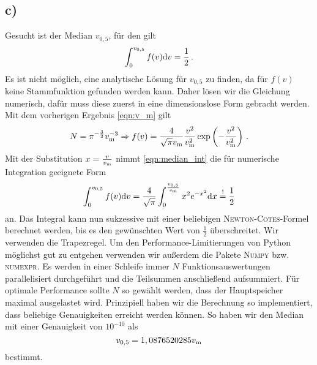 \documentclass[a4paper, 11pt]{article}
\begin{document}
\subsection*{c)}
Gesucht ist der Median $v_{0,5}$, für den gilt
\begin{equation}
    \int_{0}^{v_{0,5}} f(v) \textup{d}v = \frac{1}{2} \,.
    \label{eqn:median_int}
\end{equation}
Es ist nicht möglich, eine analytische Lösung für $v_{0,5}$ zu finden, da für $f(v)$ keine Stammfunktion gefunden werden kann. Daher lösen wir die Gleichung numerisch, dafür muss diese zuerst in eine dimensionslose Form gebracht werden. Mit dem vorherigen Ergebnis \eqref{eqn:v_m} gilt
\begin{equation}
    N = \pi^{-\frac{3}{2}}v_\textup{m}^{-3} \Rightarrow f(v) = \frac{4}{\sqrt{\pi}v_\textup{m}}\frac{v^2}{v_\textup{m}^2} \exp\left(-\frac{v^2}{v_\textup{m}^2}\right)\,.
\end{equation}
Mit der Substitution $x = \frac{v}{v_\textup{m}}$ nimmt \eqref{eqn:median_int} die für numerische Integration geeignete Form
\begin{equation}
    \int_{0}^{v_{0,5}} f(v) \textup{d}v = \frac{4}{\sqrt{\pi}} \int_{0}^{\frac{v_{0,5}}{v_\textup{m}}} x^2 e^{-x^2} \textup{d}x \stackrel{\textup{!}}{=} \frac{1}{2}
\end{equation}
an. Das Integral kann nun sukzessive mit einer beliebigen \textsc{Newton}-\textsc{Cotes}-Formel berechnet werden, bis es den gewünschten Wert von $\frac{1}{2}$ überschreitet. Wir verwenden die Trapezregel. Um den Performance-Limitierungen von Python möglichst gut zu entgehen verwenden wir außerdem die Pakete \textsc{Numpy} bzw. \textsc{numexpr}. Es werden in einer Schleife immer $N$ Funktionsauswertungen parallelisiert durchgeführt und die Teilsummen anschließend aufsummiert. Für optimale Performance sollte $N$ so gewählt werden, dass der Hauptspeicher maximal ausgelastet wird. Prinzipiell haben wir die Berechnung so implementiert, dass beliebige Genauigkeiten erreicht werden können. So haben wir den Median mit einer Genauigkeit von $10^{-10}$ als
\begin{equation}
    v_{0,5} = 1,0876520285 v_\textup{m}
\end{equation}
bestimmt.
\end{document}
